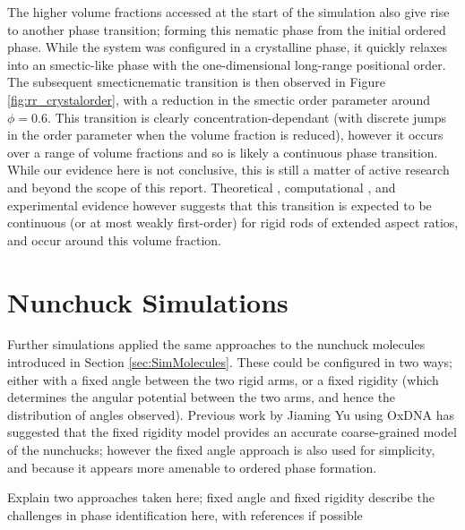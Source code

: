 \documentclass[11pt, a4paper]{article} %
\begin{document}
The higher volume fractions accessed at the start of the simulation also give rise to another phase transition; forming this nematic phase from the initial ordered phase. While the system was configured in a crystalline phase, it quickly relaxes into an smectic-like phase with the one-dimensional long-range positional order. The subsequent smectic\textendash nematic transition is then observed in Figure \ref{fig:rr_crystalorder}, with a reduction in the smectic order parameter around $\phi  = 0.6$. This transition is clearly concentration-dependant (with discrete jumps in the order parameter when the volume fraction is reduced), however it occurs over a range of volume fractions and so is likely a continuous phase transition. While our evidence here is not conclusive, this is still a matter of active research and beyond the scope of this report. Theoretical \cite{Wen1987}, computational \cite{Frenkel1988, McGrother1996}, and experimental \cite{Dogic1997, Doane1972} evidence however suggests that this transition is expected to be continuous (or at most weakly first-order) for rigid rods of extended aspect ratios, and occur around this volume fraction. 

\section{Nunchuck Simulations}
Further simulations applied the same approaches to the nunchuck molecules introduced in Section \ref{sec:SimMolecules}. These could be configured in two ways; either with a fixed angle between the two rigid arms, or a fixed rigidity (which determines the angular potential between the two arms, and hence the distribution of angles observed). Previous work by Jiaming Yu using OxDNA \cite{OxDNA} has suggested that the fixed rigidity model provides an accurate coarse-grained model of the nunchucks; however the fixed angle approach is also used for simplicity, and because it appears more amenable to ordered phase formation.

Explain two approaches taken here; fixed angle and fixed rigidity
describe the challenges in phase identification here, with references if possible
\end{document}
